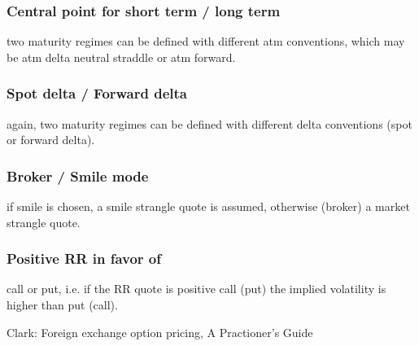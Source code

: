 \documentclass{amsart}
\theoremstyle{plain}
\numberwithin{equation}{section}
\begin{document}
\subsubsection{Central point for short term / long term}
two maturity regimes can be defined with different atm conventions, which may be atm delta
neutral straddle or atm forward.

\subsubsection{Spot delta / Forward delta}
again, two maturity regimes can be defined with different delta conventions (spot or forward
delta).

\subsubsection{Broker / Smile mode}
if smile is chosen, a smile strangle quote is assumed, otherwise (broker) a market strangle
quote.

\subsubsection{Positive RR in favor of}
call or put, i.e. if the RR quote is positive call (put) the implied volatility is higher than put
(call).



\begin{thebibliography}{4}

Clark: Foreign exchange option pricing, A Practioner's Guide

\end{thebibliography}
  
\end{document}
